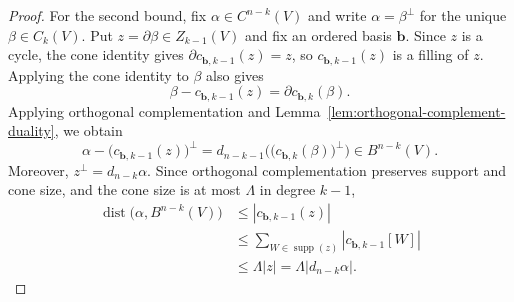 \documentclass[10pt,a4paper]{amsart}
\newcommand{\supp}{\operatorname{supp}}
\begin{document}
\begin{proof}
For the second bound, fix $\alpha\in C^{n-k}(V)$ and write
$\alpha=\beta^\perp$ for the unique $\beta\in C_k(V)$. Put
$z=\partial\beta\in Z_{k-1}(V)$ and fix an ordered basis $\mathbf b$.
Since $z$ is a cycle, the cone identity gives
$\partial c_{\mathbf b,k-1}(z)=z$, so
$c_{\mathbf b,k-1}(z)$ is a filling of $z$. Applying the cone identity
to $\beta$ also gives
\[
 \beta-c_{\mathbf b,k-1}(z)
 =
 \partial c_{\mathbf b,k}(\beta).
\]
Applying orthogonal complementation and
Lemma~\ref{lem:orthogonal-complement-duality}, we obtain
\[
 \alpha-\bigl(c_{\mathbf b,k-1}(z)\bigr)^\perp
 =
 d_{n-k-1}\bigl(\bigl(c_{\mathbf b,k}(\beta)\bigr)^\perp\bigr)
 \in B^{n-k}(V).
\]
Moreover, $z^\perp=d_{n-k}\alpha$. Since orthogonal complementation
preserves support and cone size, and the cone size is at most $\Lambda$ in degree
$k-1$,
\begin{align*}
 \operatorname{dist}\bigl(\alpha,B^{n-k}(V)\bigr)
 &\le |c_{\mathbf b,k-1}(z)|\\
 &\le
 \sum_{W\in\supp(z)}|c_{\mathbf b,k-1}[W]|\\
 &\le \Lambda|z|
 =\Lambda|d_{n-k}\alpha|.
\end{align*}
\end{proof}
\end{document}
